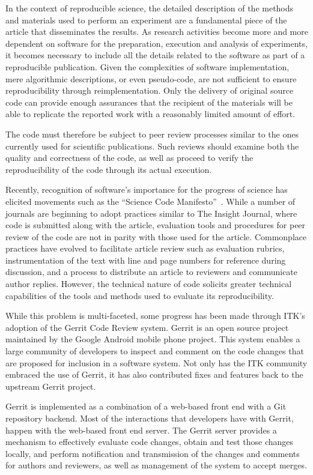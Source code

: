 \documentclass{frontiersENG} %
\begin{document}
In the context of reproducible science, the detailed description of the methods
and materials used to perform an experiment are a fundamental piece of the
article that disseminates the results. As research activities become more and
more dependent on software for the preparation, execution and analysis of
experiments, it becomes necessary to include all the details related to the
software as part of a reproducible publication. Given the complexities of
software implementation, mere algorithmic descriptions, or even pseudo-code,
are not sufficient to ensure reproducibility through reimplementation. Only the
delivery of original source code can provide enough assurances that the
recipient of the materials will be able to replicate the reported work with a
reasonably limited amount of effort.

The code must therefore be subject to peer review processes similar to the ones
currently used for scientific publications. Such reviews should examine both
the quality and correctness of the code, as well as proceed to verify the
reproducibility of the code through its actual execution.

Recently, recognition of software's importance for the progress of science has
elicited movements such as the ``Science Code Manifesto''~\cite{Barnes2011}.
While a number of journals are beginning to adopt practices similar to The
Insight Journal, where code is submitted along with the article, evaluation
tools and procedures for peer review of the code are not in parity with those
used for the article. Commonplace practices have evolved to facilitate article
review such as evaluation rubrics, instrumentation of the text with line and
page numbers for reference during discussion, and a process to distribute an
article to reviewers and communicate author replies. However, the technical
nature of code solicits greater technical capabilities of the tools and
methods used to evaluate its reproducibility.

While this problem is multi-faceted, some progress has been made through ITK’s
adoption of the Gerrit Code Review system.  Gerrit is an open source project
maintained by the Google Android mobile phone project. This system enables a
large community of developers to inspect and comment on the code changes that
are proposed for inclusion in a software system. Not only has the ITK community
embraced the use of Gerrit, it has also contributed fixes and features back to
the upstream Gerrit project.

Gerrit is implemented as a combination of a web-based front end with a Git
repository backend. Most of the interactions that developers have with Gerrit,
happen with the web-based front end server. The Gerrit server provides a
mechanism to effectively evaluate code changes, obtain and test those changes
locally, and perform notification and transmission of the changes and comments
for authors and reviewers, as well as management of the system to accept
merges.
\end{document}
